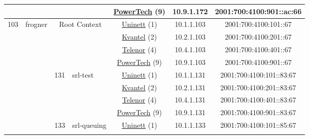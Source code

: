 \begin{small}
\begin{center}
\begin{longtable}{|c|c|c|c|c|c|c|c|}
  &  &  &  & \multicolumn{2}{|c|}{\tiny{\href{http://www.powertech.no}{PowerTech} (9)}} & \tiny{10.9.1.172} & \tiny{2001:700:4100:901::ac:66} \\ \hline
 \multirow{28}{*}{\tiny{103}} & \multicolumn{1}{|l|}{\multirow{28}{*}{\tiny{frogner}}} & \multicolumn{2}{|c|}{\multirow{4}{*}{\tiny{Root Context}}} & \multicolumn{2}{|c|}{\tiny{\href{https://www.uninett.no}{Uninett} (1)}} & \tiny{10.1.1.103} & \tiny{2001:700:4100:101::67} \\* \cline{5-5}\cline{6-6}\cline{7-7}\cline{8-8}
  &  & \multicolumn{2}{|c|}{} & \multicolumn{2}{|c|}{\tiny{\href{http://kvantel.no}{Kvantel} (2)}} & \tiny{10.2.1.103} & \tiny{2001:700:4100:201::67} \\* \cline{5-5}\cline{6-6}\cline{7-7}\cline{8-8}
  &  & \multicolumn{2}{|c|}{} & \multicolumn{2}{|c|}{\tiny{\href{https://www.telenor.no}{Telenor} (4)}} & \tiny{10.4.1.103} & \tiny{2001:700:4100:401::67} \\* \cline{5-5}\cline{6-6}\cline{7-7}\cline{8-8}
  &  & \multicolumn{2}{|c|}{} & \multicolumn{2}{|c|}{\tiny{\href{http://www.powertech.no}{PowerTech} (9)}} & \tiny{10.9.1.103} & \tiny{2001:700:4100:901::67} \\* \cline{3-3}\cline{4-4}\cline{5-5}\cline{6-6}\cline{7-7}\cline{8-8}
  &  & \multirow{4}{*}{\tiny{131}} & \multicolumn{1}{|l|}{\multirow{4}{*}{\tiny{srl-test}}} & \multicolumn{2}{|c|}{\tiny{\href{https://www.uninett.no}{Uninett} (1)}} & \tiny{10.1.1.131} & \tiny{2001:700:4100:101::83:67} \\* \cline{5-5}\cline{6-6}\cline{7-7}\cline{8-8}
  &  &  &  & \multicolumn{2}{|c|}{\tiny{\href{http://kvantel.no}{Kvantel} (2)}} & \tiny{10.2.1.131} & \tiny{2001:700:4100:201::83:67} \\* \cline{5-5}\cline{6-6}\cline{7-7}\cline{8-8}
  &  &  &  & \multicolumn{2}{|c|}{\tiny{\href{https://www.telenor.no}{Telenor} (4)}} & \tiny{10.4.1.131} & \tiny{2001:700:4100:401::83:67} \\* \cline{5-5}\cline{6-6}\cline{7-7}\cline{8-8}
  &  &  &  & \multicolumn{2}{|c|}{\tiny{\href{http://www.powertech.no}{PowerTech} (9)}} & \tiny{10.9.1.131} & \tiny{2001:700:4100:901::83:67} \\* \cline{3-3}\cline{4-4}\cline{5-5}\cline{6-6}\cline{7-7}\cline{8-8}
  &  & \multirow{4}{*}{\tiny{133}} & \multicolumn{1}{|l|}{\multirow{4}{*}{\tiny{srl-queuing}}} & \multicolumn{2}{|c|}{\tiny{\href{https://www.uninett.no}{Uninett} (1)}} & \tiny{10.1.1.133} & \tiny{2001:700:4100:101::85:67} \\* \cline{5-5}\cline{6-6}\cline{7-7}\cline{8-8}

\end{longtable}
\end{center}
\end{small}
